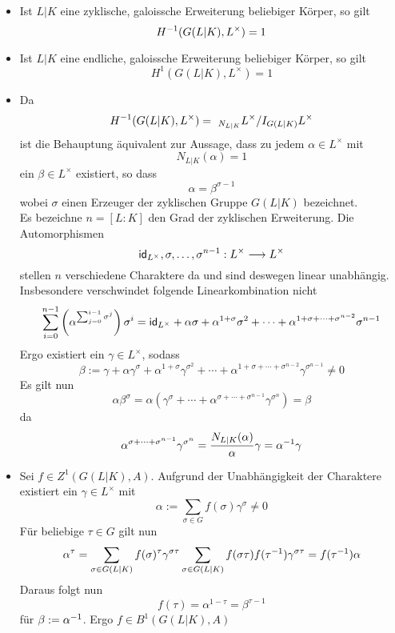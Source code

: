 \begin{itemize}
\item Ist $L|K$ eine zyklische, galoissche Erweiterung beliebiger Körper, so gilt
\[ H^{-1}(G(L|K), L^\times) = 1 \]
\item Ist $L|K$ eine endliche, galoissche Erweiterung beliebiger Körper, so gilt
\[ H^1(G(L|K), L^\times) = 1 \]
\end{itemize}
\begin{Beweis}{}
\begin{itemize}
\item Da
\[ H\i(G(L|K), L^\times) = \ _{N_{L|K}}L^\times / I_{G(L|K)}L^\times \]
ist die Behauptung äquivalent zur Aussage, dass zu jedem $\alpha \in L^\times$ mit
\[ N_{L|K}(\alpha) = 1 \]
ein $\beta \in L^\times$ existiert, so dass
\[ \alpha = \beta^{\sigma - 1} \]
wobei $\sigma$ einen Erzeuger der zyklischen Gruppe $G(L|K)$ bezeichnet.\\
Es bezeichne $n = [L:K]$ den Grad der zyklischen Erweiterung. Die Automorphismen
\[ \textsf{id}_{L^{\times}}, \sigma, \ldots, \sigma^{n-1} : L^\times \overset{}{\longrightarrow} L^\times \]
stellen $n$ verschiedene Charaktere da und sind deswegen linear unabhängig. Insbesondere verschwindet folgende Linearkombination nicht
\[ \sum_{i=0}^{n-1} \left(\alpha^{\sum_{j = 0}^{i - 1} \sigma^j }\right) \sigma^i = \textsf{id}_{L^\times} + \alpha \sigma + \alpha^{1 + \sigma} \sigma^2 +  \cdots + \alpha^{1 + \sigma + \cdots + \sigma^{n-2}} \sigma^{n-1}  \]
 Ergo existiert ein $\gamma \in L^\times$, sodass
\[ \beta := \gamma + \alpha \gamma^\sigma + \alpha^{1 + \sigma} \gamma^{\sigma^2} + \cdots + \alpha^{1+\sigma + \cdots + \sigma^{n-2}}\gamma^{\sigma^{n-1}} \neq 0 \]
Es gilt nun
\[ \alpha \beta^\sigma = \alpha (\gamma^\sigma + \cdots + \alpha^{\sigma + \cdots + \sigma^{n-1}}\gamma^{\sigma^n} ) = \beta \]
da
\[ \alpha^{\sigma + \cdots + \sigma^{n-1}}\gamma^{\sigma^n} = \frac{N_{L|K}(\alpha)}{\alpha} \gamma = \alpha^{-1} \gamma \]
\item Sei $f \in Z^1(G(L|K),A)$. Aufgrund der Unabhängigkeit der Charaktere existiert ein $\gamma \in L^\times$ mit
\[ \alpha := \sum_{\sigma \in G} f(\sigma) \gamma^\sigma \neq 0  \]
Für beliebige $\tau \in G$ gilt nun
\[ \alpha^\tau = \sum_{\sigma \in G(L|K)} f(\sigma)^\tau \gamma^{\sigma \tau} \sum_{\sigma \in G(L|K)} f(\sigma\tau)f(\tau^{-1}) \gamma^{\sigma \tau} = f(\tau^{-1})\alpha \]
Daraus folgt nun
\[ f(\tau) = \alpha^{1 - \tau} = \beta^{\tau - 1} \]
für $\beta := \alpha^{-1}$. Ergo $f \in B^1(G(L|K),A)$
\end{itemize}
\end{Beweis}

